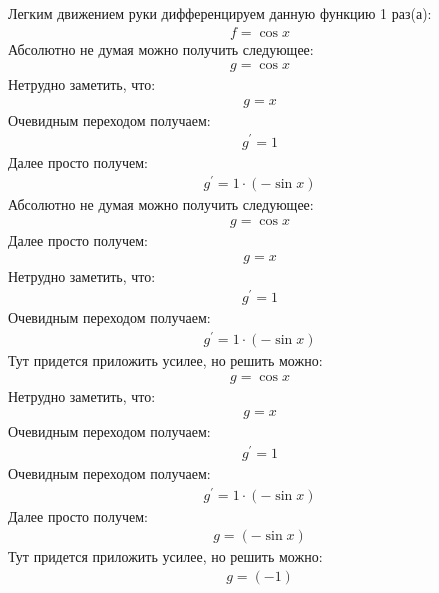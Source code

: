 \documentclass[12pt,a4paper]{scrartcl}
\begin{document}
Легким движением руки дифференцируем данную функцию 1 раз(а):
\begin{gather}\label{eq:f2a56b10}f  =  \cos{ x } \end{gather}
Абсолютно не думая можно получить следующее:
\begin{gather}\label{eq:f2a56b10}g  =  \cos{ x } \end{gather}
Нетрудно заметить, что:
\begin{gather}\label{eq:f2a56ae0}g  = x\end{gather}
Очевидным переходом получаем:
\begin{gather}\label{eq:f2a56c90}g^\prime  = 1\end{gather}
Далее просто получем:
\begin{gather}\label{eq:f2a56c60}g^\prime  = 1 \cdot  \left(- \sin{ x } \right) \end{gather}
Абсолютно не думая можно получить следующее:
\begin{gather}\label{eq:f2a56c90}g  =  \cos{ x } \end{gather}
Далее просто получем:
\begin{gather}\label{eq:f2a56cc0}g  = x\end{gather}
Нетрудно заметить, что:
\begin{gather}\label{eq:f2a57260}g^\prime  = 1\end{gather}
Очевидным переходом получаем:
\begin{gather}\label{eq:f2a57230}g^\prime  = 1 \cdot  \left(- \sin{ x } \right) \end{gather}
Тут придется приложить усилее, но решить можно:
\begin{gather}\label{eq:f2a57260}g  =  \cos{ x } \end{gather}
Нетрудно заметить, что:
\begin{gather}\label{eq:f2a57290}g  = x\end{gather}
Очевидным переходом получаем:
\begin{gather}\label{eq:f2a57440}g^\prime  = 1\end{gather}
Очевидным переходом получаем:
\begin{gather}\label{eq:f2a57410}g^\prime  = 1 \cdot  \left(- \sin{ x } \right) \end{gather}
Далее просто получем:
\begin{gather}\label{eq:f2a57290}g  =  \left(- \sin{ x } \right) \end{gather}
Тут придется приложить усилее, но решить можно:
\begin{gather}\label{eq:f2a57440}g  = \left(-1\right)\end{gather}
\end{document}
